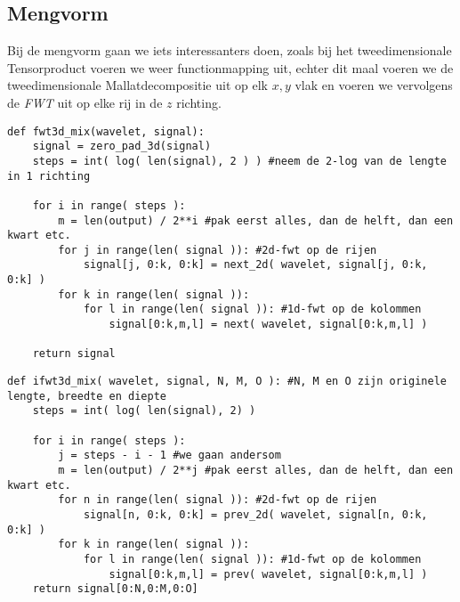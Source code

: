 \subsection{Mengvorm}
Bij de mengvorm gaan we iets interessanters doen, zoals bij het tweedimensionale Tensorproduct
voeren we weer functionmapping uit, echter dit maal voeren we de tweedimensionale Mallatdecompositie
uit op elk $x,y$ vlak en voeren we vervolgens de \emph{FWT} uit op elke rij in de $z$ richting.
\begin{lstlisting}[caption=De mengvorm in 3 dimensies]
def fwt3d_mix(wavelet, signal):
	signal = zero_pad_3d(signal)
	steps = int( log( len(signal), 2 ) ) #neem de 2-log van de lengte in 1 richting
	
	for i in range( steps ):
		m = len(output) / 2**i #pak eerst alles, dan de helft, dan een kwart etc.
		for j in range(len( signal )): #2d-fwt op de rijen
			signal[j, 0:k, 0:k] = next_2d( wavelet, signal[j, 0:k, 0:k] )
		for k in range(len( signal )):
			for l in range(len( signal )): #1d-fwt op de kolommen
				signal[0:k,m,l] = next( wavelet, signal[0:k,m,l] )

	return signal
\end{lstlisting}
\begin{lstlisting}[caption=De omgekeerde mengvorm in 3 dimensies]
def ifwt3d_mix( wavelet, signal, N, M, O ): #N, M en O zijn originele lengte, breedte en diepte
	steps = int( log( len(signal), 2) )
	
	for i in range( steps ):
		j = steps - i - 1 #we gaan andersom
		m = len(output) / 2**j #pak eerst alles, dan de helft, dan een kwart etc.
		for n in range(len( signal )): #2d-fwt op de rijen
			signal[n, 0:k, 0:k] = prev_2d( wavelet, signal[n, 0:k, 0:k] )
		for k in range(len( signal )):
			for l in range(len( signal )): #1d-fwt op de kolommen
				signal[0:k,m,l] = prev( wavelet, signal[0:k,m,l] )
	return signal[0:N,0:M,0:O]
\end{lstlisting}

